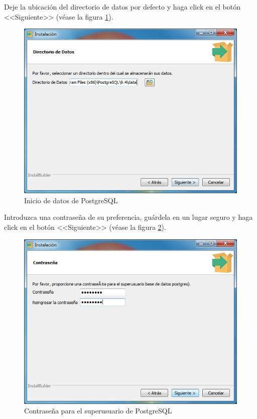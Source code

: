 Deje la ubicaci\'{o}n del directorio de datos por defecto y haga click en el bot\'{o}n <<Siguiente>> (v\'{e}ase la figura \ref{fig:postgres3}).
\vfill
\begin{figure}[H]
  \centering
  \includegraphics[width=.6\linewidth]{./img/postgres3.jpg}
\caption[]{Inicio de datos de PostgreSQL\label{fig:postgres3}}
\end{figure}
\vfill
Introduzca una contrase\~{n}a de su preferencia, gu\'{a}rdela en un lugar seguro y haga click en el bot\'{o}n <<Siguiente>> (v\'{e}ase la figura \ref{fig:postgres4}).
\vfill
\begin{figure}[H]
  \centering
  \includegraphics[width=.6\linewidth]{./img/postgres4.jpg}
\caption[]{Contrase\~{n}a para el superusuario de PostgreSQL\label{fig:postgres4}}
\end{figure}
\vfill
\newpage


